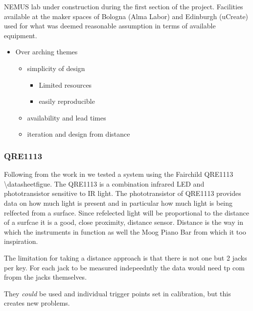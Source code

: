 NEMUS lab under construction during the first section of the project.
Facilities available at the maker spaces of Bologna (Alma Labor) and
Edinburgh (uCreate) used for what was deemed reasonable assumption in
terms of available equipment.

\begin{itemize}
\item
  Over arching themes

  \begin{itemize}
  \item
    simplicity of design

    \begin{itemize}
    \item
      Limited resources
    \item
      easily reproducible
    \end{itemize}
  \item
    availability and lead times
  \item
    iteration and design from distance
  \end{itemize}
\end{itemize}

\subsubsection{QRE1113}\label{qre1113}

Following from the work in \cite{McPherson2013, McPherson2019} we tested
a system using the Fairchild QRE1113 \textbackslash datasheetfigue. The
QRE1113 is a combination infrared LED and phototransistor sensitive to
IR light. The phototransistor of QRE1113 provides data on how much light
is present and in particular how much light is being relfected from a
surface. Since refelected light will be proportional to the distance of
a surfcae it is a good, close proximity, distance sensor. Distance is
the way in which the instruments in \cite{McPherson2013, McPherson2019}
function as well the Moog Piano Bar from which it too inspiration.

The limitation for taking a distance approach is that there is not one
but 2 jacks per key. For each jack to be measured indepeedntly the data
would need tp com fropm the jacks themselves.

They \emph{could} be used and individual trigger points set in
calibration, but this creates new problems.

